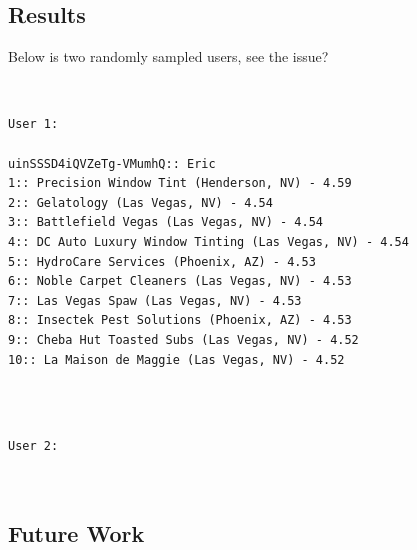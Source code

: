 \documentclass{article}
\begin{document}
\subsection*{Results}

Below is two randomly sampled users, see the issue?

\mbox{}\\
\begin{verbatim}
User 1:

uinSSSD4iQVZeTg-VMumhQ:: Eric
1:: Precision Window Tint (Henderson, NV) - 4.59
2:: Gelatology (Las Vegas, NV) - 4.54
3:: Battlefield Vegas (Las Vegas, NV) - 4.54
4:: DC Auto Luxury Window Tinting (Las Vegas, NV) - 4.54
5:: HydroCare Services (Phoenix, AZ) - 4.53
6:: Noble Carpet Cleaners (Las Vegas, NV) - 4.53
7:: Las Vegas Spaw (Las Vegas, NV) - 4.53
8:: Insectek Pest Solutions (Phoenix, AZ) - 4.53
9:: Cheba Hut Toasted Subs (Las Vegas, NV) - 4.52
10:: La Maison de Maggie (Las Vegas, NV) - 4.52
\end{verbatim}
\mbox{}\\

\mbox{}\\
\begin{verbatim}
User 2:
\end{verbatim}
\mbox{}\\

\subsection*{Future Work}

\medskip



\end{document}

